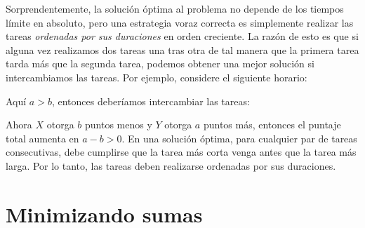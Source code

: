 Sorprendentemente, la solución óptima al problema
no depende de los tiempos límite en absoluto,
pero una estrategia voraz correcta es simplemente
realizar las tareas \emph{ordenadas por sus duraciones}
en orden creciente.
La razón de esto es que si alguna vez realizamos
dos tareas una tras otra de tal manera que la primera tarea
tarda más que la segunda tarea,
podemos obtener una mejor solución si intercambiamos las tareas.
Por ejemplo, considere el siguiente horario:
\begin{center}
\end{center}
Aquí $a>b$, entonces deberíamos intercambiar las tareas:
\begin{center}
\end{center}
Ahora $X$ otorga $b$ puntos menos y $Y$ otorga $a$ puntos más,
entonces el puntaje total aumenta en $a-b > 0$.
En una solución óptima,
para cualquier par de tareas consecutivas,
debe cumplirse que la tarea más corta venga
antes que la tarea más larga.
Por lo tanto, las tareas deben realizarse
ordenadas por sus duraciones.

\section{Minimizando sumas}

